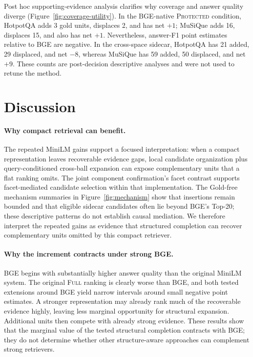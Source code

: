 \documentclass[11pt]{article}
\newcommand{\full}{\textsc{Full}\xspace}
\newcommand{\prot}{\textsc{Protected}\xspace}
\begin{document}
Post hoc supporting-evidence analysis clarifies why coverage and answer quality diverge
(Figure~\ref{fig:coverage-utility}). In the BGE-native \prot condition,
HotpotQA adds 3 gold units, displaces 2, and has net $+1$; MuSiQue adds 16,
displaces 15, and also has net $+1$. Nevertheless, answer-F1 point estimates
relative to BGE are negative. In the cross-space sidecar, HotpotQA has 21
added, 29 displaced, and net $-8$, whereas MuSiQue has 59 added, 50 displaced,
and net $+9$. These counts are post-decision descriptive analyses and were not
used to retune the method.

\section{Discussion}

\paragraph{Why compact retrieval can benefit.}
The repeated MiniLM gains support a focused interpretation: when a
compact representation leaves recoverable evidence gaps, local candidate
organization plus query-conditioned cross-ball expansion can expose
complementary units that a flat ranking omits. The joint component
confirmation's facet contrast supports facet-mediated candidate selection
within that implementation. The Gold-free mechanism summaries in
Figure~\ref{fig:mechanism} show that insertions remain bounded and that
eligible sidecar candidates often lie beyond BGE's Top-20; these descriptive
patterns do not establish causal mediation. We therefore interpret the repeated gains as
evidence that structured completion can recover complementary units omitted by
this compact retriever.

\paragraph{Why the increment contracts under strong BGE.}
BGE begins with substantially higher answer quality than the original MiniLM
system. The original \full ranking is clearly worse than BGE, and both tested
extensions around BGE yield narrow intervals around small negative point
estimates. A stronger representation may already rank much of the recoverable
evidence highly, leaving less marginal opportunity for structural expansion.
Additional units then compete with already strong evidence. These results show
that the marginal value of the tested structural completion contracts with
BGE; they do not determine whether other structure-aware approaches can
complement strong retrievers.
\end{document}

